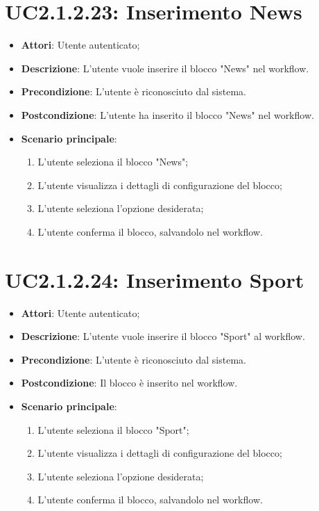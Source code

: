 \section{UC2.1.2.23: Inserimento News}
\label{UC2.1.2.23}
\begin{itemize}
	\item \textbf{Attori}: Utente autenticato;
	\item \textbf{Descrizione}: L'utente vuole inserire il blocco "News" nel workflow.
	\item \textbf{Precondizione}: L'utente è riconosciuto dal sistema.
	\item \textbf{Postcondizione}: L'utente ha inserito il blocco "News" nel workflow.
	\item \textbf{Scenario principale}:
	\begin{enumerate} \item L'utente seleziona il blocco "News";  \item L'utente visualizza i dettagli di configurazione del blocco; \item  L'utente seleziona l'opzione desiderata;  \item  L'utente conferma il blocco, salvandolo nel workflow.\end{enumerate}
\end{itemize}

\section{UC2.1.2.24: Inserimento Sport}
\label{UC2.1.2.24}
\begin{itemize}
	\item \textbf{Attori}: Utente autenticato;
	\item \textbf{Descrizione}: L'utente vuole inserire il blocco "Sport" al workflow.
	\item \textbf{Precondizione}: L'utente è riconosciuto dal sistema.
	\item \textbf{Postcondizione}: Il blocco è inserito nel workflow.
	\item \textbf{Scenario principale}:
	\begin{enumerate} \item L'utente seleziona il blocco "Sport";  \item L'utente visualizza i dettagli di configurazione del blocco; \item  L'utente seleziona l'opzione desiderata;  \item  L'utente conferma il blocco, salvandolo nel workflow.\end{enumerate}
\end{itemize}


